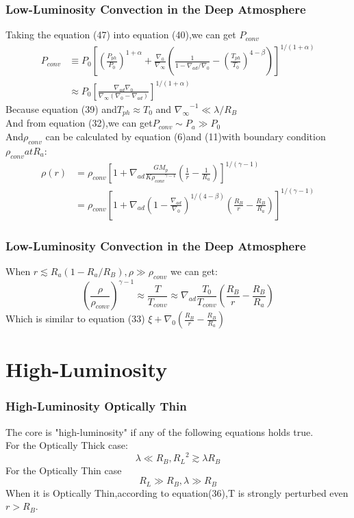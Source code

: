 \documentclass{beamer}
\begin{document}
\begin{frame}
\frametitle{Low-Luminosity Convection in the Deep Atmosphere}
Taking the equation (47) into equation (40),we can get $P_{conv}$
\begin{equation}
\begin{split}
P_{conv} &  \equiv P_0[{(\frac{P_{ph}}{P_0})}^{1+\alpha}+\frac{\nabla_0}{\nabla_{\infty}}(\frac{1}{1-\nabla_{ad}/\nabla_0}-{(\frac{T_{ph}}{T_0})}^{4-\beta})]^{1/(1+\alpha)}\\
& \approx P_0 {[\frac{\nabla_{ad}\nabla_0}{\nabla_{\infty}(\nabla_0-\nabla_{ad})}]}^{1/(1+\alpha)}
\end{split}
\end{equation}
Because equation (39) and$ T_{ph} \approx T_0 $ and ${\nabla_{\infty}}^{-1} \ll \lambda/R_B$\\
And from equation (32),we can get$P_{conv} \sim P_a \gg P_0$\\
And$\rho_{conv}$ can be calculated by equation (6)and (11)with boundary condition $ \rho_{conv} at R_a$:
\begin{equation}
\begin{split}
\rho(r)& =\rho_{conv}{[1+\nabla_{ad}\frac{GM_p}{K{\rho_{conv}}^{\gamma-1}}(\frac{1}{r}-\frac{1}{R_a})]}^{1/(\gamma-1)}\\
&=\rho_{conv}{[1+\nabla_{ad}{(1-\frac{\nabla_{ad}}{\nabla_0})}^{1/(4-\beta)}(\frac{R_B}{r}-\frac{R_B}{R_a})]}^{1/(\gamma-1)}
\end{split}
\end{equation}
\end{frame}

\begin{frame}
\frametitle{Low-Luminosity Convection in the Deep Atmosphere}
When $r \lesssim R_a(1-R_a/R_B),\rho \gg \rho_{conv}$ we can get:
\begin{equation}
{(\frac{\rho}{\rho_{conv}})}^{\gamma-1} \approx \frac{T}{T_{conv}} \approx \nabla_{ad}\frac{T_0}{T_{conv}}(\frac{R_B}{r}-\frac{R_B}{R_a})
\end{equation}
Which is similar to equation (33) $\xi + \nabla_0 (\frac{R_B}{r}-\frac{R_B}{R_a})$
\end{frame}

\section{High-Luminosity}
\begin{frame}
\frametitle{High-Luminosity Optically Thin}
The core is "high-luminosity" if any of the following equations holds true.\\
For the Optically Thick case:
\begin{equation}
\lambda \ll R_B , {R_L}^2 \gtrsim \lambda R_B
\end{equation}
For the Optically Thin case 
\begin{equation}
\tag{54}
R_L \gg R_B , \lambda \gg R_B 
\end{equation}
When it is Optically Thin,according to equation(36),T is strongly perturbed even $r>R_B$.
\end{frame}
\end{document}
